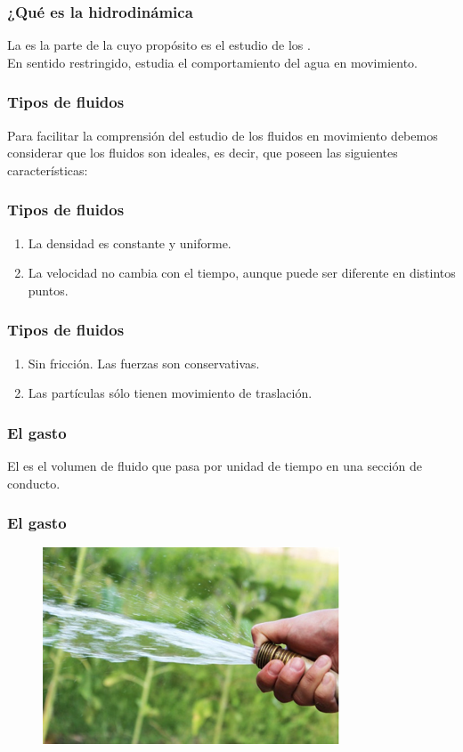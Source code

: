 \documentclass[14pt]{beamer}
\begin{document}
\begin{frame}
\frametitle{¿Qué es la hidrodinámica}
La  es la parte de la  cuyo propósito es el estudio de los .
\\
\bigskip
\pause
En sentido restringido, estudia el comportamiento del agua en movimiento.
\end{frame}
\begin{frame}
\frametitle{Tipos de fluidos}
Para facilitar la comprensión del estudio de los fluidos en movimiento debemos considerar que los fluidos son ideales, es decir, que poseen las siguientes características:
\end{frame}
\begin{frame}
\frametitle{Tipos de fluidos}
\begin{enumerate}[<+->]
\item {} La densidad es constante y uniforme.
\item {} La velocidad no cambia con el tiempo, aunque puede ser diferente en distintos puntos.
\seti 
\end{enumerate}
\end{frame}
\begin{frame}
\frametitle{Tipos de fluidos}
\begin{enumerate}[<+->]
\conti
\item {} Sin fricción. Las fuerzas son conservativas.
\item {} Las partículas sólo tienen movimiento de traslación.
\end{enumerate}
\end{frame}
\begin{frame}
\frametitle{El gasto}
El  es el volumen de fluido que pasa por unidad de tiempo en una sección de conducto.
\end{frame}
\begin{frame}
\frametitle{El gasto}
\begin{figure}
    \centering
    \includegraphics[scale=1]{Imagenes/Gasto_01.png}
\end{figure}
\end{frame}
\end{document}
